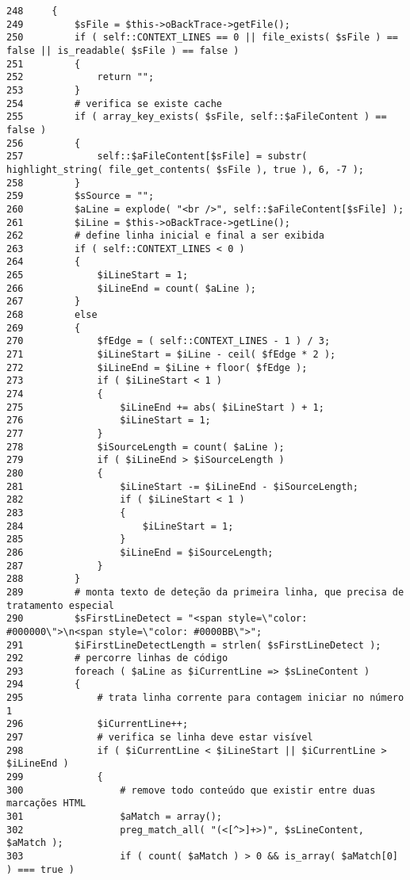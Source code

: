 \begin{Code}\begin{verbatim}248     {
249         $sFile = $this->oBackTrace->getFile();
250         if ( self::CONTEXT_LINES == 0 || file_exists( $sFile ) == false || is_readable( $sFile ) == false )
251         {
252             return "";
253         }
254         # verifica se existe cache
255         if ( array_key_exists( $sFile, self::$aFileContent ) == false )
256         {
257             self::$aFileContent[$sFile] = substr( highlight_string( file_get_contents( $sFile ), true ), 6, -7 );
258         }
259         $sSource = "";
260         $aLine = explode( "<br />", self::$aFileContent[$sFile] );
261         $iLine = $this->oBackTrace->getLine();
262         # define linha inicial e final a ser exibida
263         if ( self::CONTEXT_LINES < 0 )
264         {
265             $iLineStart = 1;
266             $iLineEnd = count( $aLine );
267         }
268         else
269         {
270             $fEdge = ( self::CONTEXT_LINES - 1 ) / 3;
271             $iLineStart = $iLine - ceil( $fEdge * 2 );
272             $iLineEnd = $iLine + floor( $fEdge );
273             if ( $iLineStart < 1 )
274             {
275                 $iLineEnd += abs( $iLineStart ) + 1;
276                 $iLineStart = 1;
277             }
278             $iSourceLength = count( $aLine );
279             if ( $iLineEnd > $iSourceLength )
280             {
281                 $iLineStart -= $iLineEnd - $iSourceLength;
282                 if ( $iLineStart < 1 )
283                 {
284                     $iLineStart = 1;
285                 }
286                 $iLineEnd = $iSourceLength;
287             }
288         }
289         # monta texto de deteção da primeira linha, que precisa de tratamento especial
290         $sFirstLineDetect = "<span style=\"color: #000000\">\n<span style=\"color: #0000BB\">";
291         $iFirstLineDetectLength = strlen( $sFirstLineDetect );
292         # percorre linhas de código
293         foreach ( $aLine as $iCurrentLine => $sLineContent )
294         {
295             # trata linha corrente para contagem iniciar no número 1
296             $iCurrentLine++;
297             # verifica se linha deve estar visível
298             if ( $iCurrentLine < $iLineStart || $iCurrentLine > $iLineEnd )
299             {
300                 # remove todo conteúdo que existir entre duas marcações HTML
301                 $aMatch = array();
302                 preg_match_all( "(<[^>]+>)", $sLineContent, $aMatch );
303                 if ( count( $aMatch ) > 0 && is_array( $aMatch[0] ) === true )

\end{verbatim}
\end{Code}
